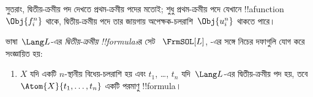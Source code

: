 \documentclass[../../../include/open-logic-section]{subfiles}
\begin{document}
\begin{explain}
সুতরাং, দ্বিতীয়-ক্রমীয় পদ দেখতে প্রথম-ক্রমীয় পদের মতোই; শুধু
প্রথম-ক্রমীয় পদে যেখানে !!a{function}~$\Obj{f^n_i}$ থাকে,
দ্বিতীয়-ক্রমীয় পদে তার জায়গায় অপেক্ষক-চলরাশি~$\Obj{u^n_i}$ থাকতে
পারে।
\end{explain}

\begin{defn}
ভাষা~$\Lang L$-এর \emph{দ্বিতীয়-ক্রমীয় !!{formula}s}র সেট
~$\FrmSOL[L]$, -এর সঙ্গে নিচের
দফাগুলি যোগ করে সংজ্ঞায়িত হয়:
\begin{enumerate}
\item $X$ যদি একটি $n$-স্থানীয় বিধেয়-চলরাশি হয় এবং $t_1$, \dots,
  $t_n$ যদি~$\Lang L$-এর দ্বিতীয়-ক্রমীয় পদ হয়, তবে
  $\Atom{X}{t_1,\ldots, t_n}$ একটি পরমাণু !!{formula}।




\end{enumerate}
\end{defn}
\end{document}
